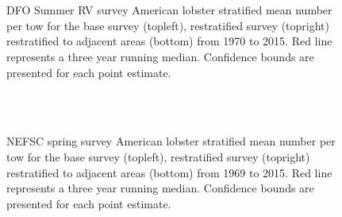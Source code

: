 \documentclass[11pt]{article}
\newcommand{\e}{/backup/bio_data/bio.lobster/figures/} %
\begin{document}
%
%
%
%
%
%
%
%
%
%
%
%
%
%
%

\begin{figure}
\centering
{}
\\
\\

\caption{DFO Summer RV survey American lobster stratified mean number per tow for the base survey (topleft), restratified survey (topright) restratified to adjacent areas (bottom) from 1970 to 2015. Red line represents a three year running median. Confidence bounds are presented for each point estimate. }
\end{figure}
\clearpage

\begin{figure}
\centering
{}
\\
\\

\caption{NEFSC spring survey American lobster stratified mean number per tow for the base survey (topleft), restratified survey (topright) restratified to adjacent areas (bottom) from 1969 to 2015. Red line represents a three year running median. Confidence bounds are presented for each point estimate. }
\end{figure}
\clearpage
\end{document}
